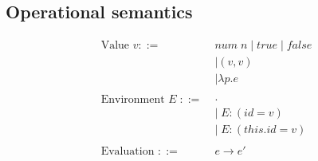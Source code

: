 \documentclass[10pt,a4paper,draft]{article}
\begin{document}
\begin{flushleft}
\section{Operational semantics}
\begin{align*}
\text{Value }v ::=\;&\mathit{num\;n} \; | \; \mathit{true} \; | \; \mathit{false} \\
&| (v,v) \\
&| \lambda p.e\\
\\
\text{Environment } E\; ::= \;&\cdot \\
&|\;E:(\mathit{id}=v) \\
&|\;E:(\mathit{this.id}=v) \\ 
\\
\text{Evaluation } ::= &e \rightarrow e' \\
\end{align*}

\end{flushleft}
\end{document}
